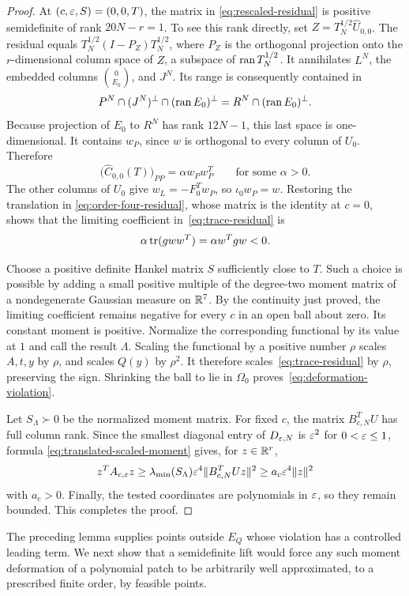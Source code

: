 \begin{proof}
At $(c,\varepsilon,S)=(0,0,T)$, the matrix in
\eqref{eq:rescaled-residual} is positive semidefinite of rank
$20N-r=1$.  To see this rank directly, set
$Z=T_N^{1/2}\widehat U_{0,0}$.  The residual equals
$T_N^{1/2}(I-P_Z)T_N^{1/2}$, where $P_Z$ is the orthogonal projection
onto the $r$-dimensional column space of $Z$, a subspace of
$\operatorname{ran} T_N^{1/2}$.  It annihilates $L^N$, the embedded columns
$\binom{0}{E_0}$, and
$J^N$.  Its range is consequently contained in
\[
 P^N\cap(J^N)^\perp\cap(\operatorname{ran} E_0)^\perp
 =R^N\cap(\operatorname{ran} E_0)^\perp.
\]
Because projection of $E_0$ to $R^N$ has rank $12N-1$, this last space is
one-dimensional.  It contains $w_P$, since $w$ is orthogonal to every
column of $U_0$.  Therefore
\[
 \bigl(\widehat C_{0,0}(T)\bigr)_{PP}
 =\alpha w_Pw_P^T\qquad\text{for some }\alpha>0.
\]
The other columns of $U_0$ give $w_L=-F_0^Tw_P$, so
$\iota_0w_P=w$.  Restoring the translation in
\eqref{eq:order-four-residual}, whose matrix is the identity at $c=0$,
shows that the limiting coefficient in~\eqref{eq:trace-residual} is
\[
 \alpha\operatorname{tr}(gww^T)=\alpha w^Tgw<0.
\]

Choose a positive definite Hankel matrix $S$ sufficiently close to $T$.
Such a choice is possible by adding a small positive multiple of the
degree-two moment matrix of a nondegenerate Gaussian measure on $\mathbb R^7$.
By the continuity just proved, the limiting coefficient remains negative
for every $c$ in an open ball about zero.  Its constant moment is positive.
Normalize the corresponding functional by its value at $1$ and call the
result $\Lambda$.  Scaling the functional by a positive number $\rho$
scales $A,t,y$ by $\rho$, and scales $Q(y)$ by $\rho^2$.  It therefore
scales~\eqref{eq:trace-residual} by $\rho$, preserving the sign.  Shrinking
the ball to lie in $\Omega_0$ proves~\eqref{eq:deformation-violation}.

Let $S_\Lambda\succ0$ be the normalized moment matrix.  For fixed $c$,
the matrix $B_{c,N}^TU$ has full column rank.  Since the smallest diagonal
entry of $D_{\varepsilon,N}$ is $\varepsilon^2$ for $0<\varepsilon\le1$, formula
\eqref{eq:translated-scaled-moment} gives, for $z\in\mathbb R^r$,
\[
 z^TA_{c,\varepsilon}z
 \ge \lambda_{\min}(S_\Lambda)\varepsilon^4
       \|B_{c,N}^TUz\|^2
 \ge a_c\varepsilon^4\|z\|^2
\]
with $a_c>0$.  Finally, the tested coordinates are polynomials in $\varepsilon$,
so they remain bounded.  This completes the proof.
\end{proof}

The preceding lemma supplies points outside $E_Q$ whose violation has a
controlled leading term.  We next show that a semidefinite lift would
force any such moment deformation of a polynomial patch to be arbitrarily
well approximated, to a prescribed finite order, by feasible points.


